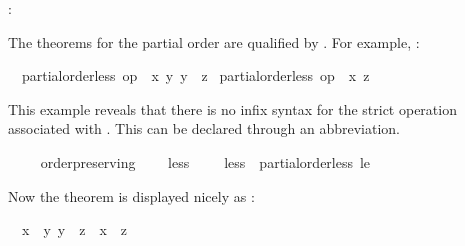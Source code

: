 \begin{isabellebody}
\begin{isamarkuptext}
  : %
\end{isamarkuptext}%
\isamarkuptrue%
%
\begin{isamarkuptext}%
The theorems for the partial order \isa{{\isasympreceq}}
  are qualified by .  For example, : \begin{isabelle}%
\ \ {\isasymlbrakk}partial{\isacharunderscore}order{\isachardot}less\ op\ {\isasympreceq}\ {\isacharquery}x\ {\isacharquery}y{\isacharsemicolon}\ {\isacharquery}y\ {\isasympreceq}\ {\isacharquery}z{\isasymrbrakk}\isanewline
\isaindent{\ \ }{\isasymLongrightarrow}\ partial{\isacharunderscore}order{\isachardot}less\ op\ {\isasympreceq}\ {\isacharquery}x\ {\isacharquery}z%
\end{isabelle}%
\end{isamarkuptext}%
\isamarkuptrue%
%
\isadeliminvisible
%
\endisadeliminvisible
%
\isataginvisible
{}\isamarkupfalse%
%
\endisataginvisible
{\isafoldinvisible}%
%
\isadeliminvisible
%
\endisadeliminvisible
%
\begin{isamarkuptext}%
This example reveals that there is no infix syntax for the
  strict operation associated with \isa{{\isasympreceq}}.  This can be declared
  through an abbreviation.%
\end{isamarkuptext}%
\isamarkuptrue%
\ \ \isamarkupfalse%
\ {\isacharparenleft}\ order{\isacharunderscore}preserving{\isacharparenright}\isanewline
\ \ \ \ less{\isacharprime}\ {\isacharparenleft}\ {\isachardoublequoteopen}{\isasymprec}{\isachardoublequoteclose}\ {}{}{\isacharparenright}\ \ {\isachardoublequoteopen}less{\isacharprime}\ {\isasymequiv}\ partial{\isacharunderscore}order{\isachardot}less\ le{\isacharprime}{\isachardoublequoteclose}%
\begin{isamarkuptext}%
Now the theorem is displayed nicely as
  :
  \begin{isabelle}%
\ \ {\isasymlbrakk}{\isacharquery}x\ {\isasymprec}\ {\isacharquery}y{\isacharsemicolon}\ {\isacharquery}y\ {\isasympreceq}\ {\isacharquery}z{\isasymrbrakk}\ {\isasymLongrightarrow}\ {\isacharquery}x\ {\isasymprec}\ {\isacharquery}z%

\end{isabelle}
\end{isamarkuptext}
\end{isabellebody}
